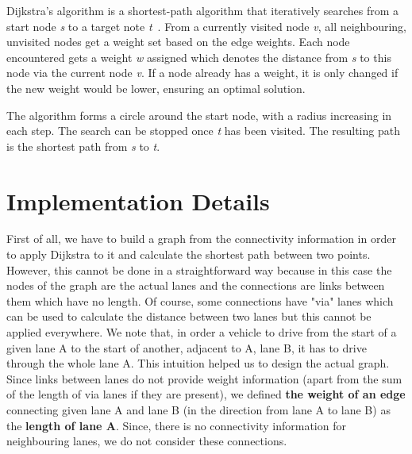 Dijkstra's algorithm is a shortest-path algorithm that iteratively searches from a start node \emph{s} to a target note \emph{t}~\cite{skiena1998algorithm}. From a currently visited node \emph{v}, all neighbouring, unvisited nodes get a weight set based on the edge weights. Each node encountered gets a weight \emph{w} assigned which denotes the distance from \emph{s} to this node via the current node \emph{v}. If a node already has a weight, it is only changed if the new weight would be lower, ensuring an optimal solution.

The algorithm forms a circle around the start node, with a radius increasing in each step. The search can be stopped once \emph{t} has been visited. The resulting path is the shortest path from \emph{s} to \emph{t}.

\section{Implementation Details}
First of all, we have to build a graph from the connectivity information in order to apply Dijkstra to it and calculate the shortest path between two points. However, this cannot be done in a straightforward way because in this case the nodes of the graph are the actual lanes and the connections are links between them which have no length. Of course, some connections have "via" lanes which can be used to calculate the distance between two lanes but this cannot be applied everywhere. We note that, in order a vehicle to drive from the start of a given lane A to the start of another, adjacent to A, lane B, it has to drive through the whole lane A. This intuition helped us to design the actual graph. Since links between lanes do not provide weight information (apart from the sum of the length of via lanes if they are present), we defined \textbf{the weight of an edge} connecting given lane A and lane B (in the direction from lane A to lane B) as the \textbf{length of lane A}. Since, there is no connectivity information for neighbouring lanes, we do not consider these connections.

